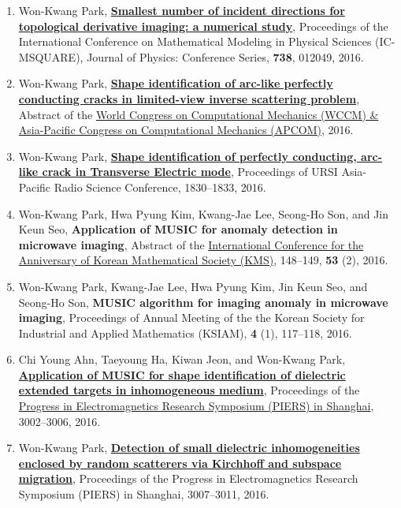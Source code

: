 \documentclass[10pt,A4]{article}
\begin{document}
\begin{enumerate}
\item\label{C-ICMSQUARE2016} Won-Kwang Park, \href{http://dx.doi.org/10.1088/1742-6596/738/1/012049}{\textbf{Smallest number of incident directions for topological derivative imaging: a numerical study}}, Proceedings of the International Conference on Mathematical Modeling in Physical Sciences (IC-MSQUARE), Journal of Physics: Conference Series, \textbf{738}, 012049, 2016.
\item\label{C-WCCM2016} Won-Kwang Park, \href{http://wccm2016.org/wp/pdf/150287.pdf}{\textbf{Shape identification of arc-like perfectly conducting cracks in limited-view inverse scattering problem}}, Abstract of the \href{http://http://wccm2016.org}{ World Congress on Computational Mechanics (WCCM) \&  Asia-Pacific Congress on Computational Mechanics (APCOM)}, 2016.
\item\label{C-URSI2016} Won-Kwang Park, \href{http://dx.doi.org/10.1109/URSIAP-RASC.2016.7601203}{\textbf{Shape identification of perfectly conducting, arc-like crack in Transverse Electric mode}}, Proceedings of URSI Asia-Pacific Radio Science Conference, 1830--1833, 2016.
\item\label{C-KMS2016} Won-Kwang Park, Hwa Pyung Kim, Kwang-Jae Lee, Seong-Ho Son, and Jin Keun Seo, \textbf{Application of MUSIC for anomaly detection in microwave imaging}, Abstract of the \href{http://www.kms.or.kr/fall2016/}{International Conference for the  Anniversary of Korean Mathematical Society (KMS)}, 148--149, \textbf{53} (2), 2016.
\item\label{C-KSIAM2016C} Won-Kwang Park, Kwang-Jae Lee, Hwa Pyung Kim, Jin Keun Seo, and Seong-Ho Son, \textbf{MUSIC algorithm for imaging anomaly in microwave imaging}, Proceedings of Annual Meeting of the the Korean Society for Industrial and Applied Mathematics (KSIAM), \textbf{4} (1), 117--118, 2016.
\item\label{C-PIERS2016A} Chi Young Ahn, Taeyoung Ha, Kiwan Jeon, and Won-Kwang Park, \href{http://dx.doi.org/10.1109/PIERS.2016.7735177}{\textbf{Application of MUSIC for shape identification of dielectric extended targets in inhomogeneous medium}}, Proceedings of the \href{http://www.piers.org/piers2016Shanghai/}{Progress in Electromagnetics Research Symposium (PIERS) in Shanghai}, 3002--3006, 2016.
\item\label{C-PIERS2016B} Won-Kwang Park, \href{http://dx.doi.org/10.1109/PIERS.2016.7735178}{\textbf{Detection of small dielectric inhomogeneities enclosed by random scatterers via Kirchhoff and subspace migration}}, Proceedings of the Progress in Electromagnetics Research Symposium (PIERS) in Shanghai, 3007--3011, 2016.

\end{enumerate}
\end{document}
